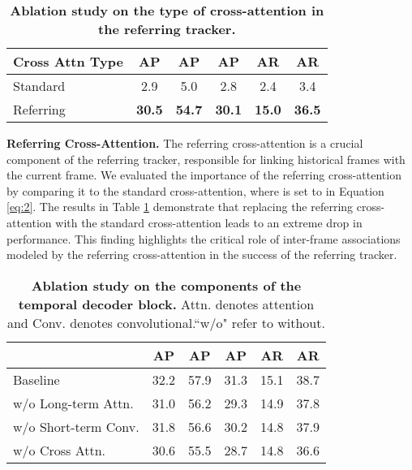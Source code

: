 \documentclass[10pt,twocolumn,letterpaper]{article}
\begin{document}
\begin{table}[t]
\centering
\begin{tabular}{l|ccccc}
	Cross Attn Type & AP &  AP & AP & AR & AR  \\
	\hline
	Standard & 2.9 & 5.0 & 2.8 & 2.4 & 3.4 \\
	Referring & \textbf{30.5} & \textbf{54.7} & \textbf{30.1} & \textbf{15.0} & \textbf{36.5} \\
\hline
 \end{tabular}
 \caption{\textbf{Ablation study on the type of cross-attention in the referring tracker.}}\vspace{-2mm}
 \label{tab:cross attn}
\end{table}

\textbf{Referring Cross-Attention.} The referring cross-attention is a crucial component of the referring tracker, responsible for linking historical frames with the current frame. We evaluated the importance of the referring cross-attention by comparing it to the standard cross-attention, where  is set to  in Equation \ref{eq:2}. The results in Table \ref{tab:cross attn} demonstrate that replacing the referring cross-attention with the standard cross-attention leads to an extreme drop in performance. This finding highlights the critical role of inter-frame associations modeled by the referring cross-attention in the success of the referring tracker.

\begin{table}[t]
\centering
\setlength{\tabcolsep}{1.4mm}
\begin{tabular}{l|ccccc}
	 & AP &  AP & AP & AR & AR  \\
	\hline
	Baseline & 32.2 & 57.9 & 31.3 & 15.1 & 38.7 \\
	w/o Long-term Attn. & 31.0 & 56.2 & 29.3 & 14.9 & 37.8 \\
	w/o Short-term Conv. & 31.8 & 56.6 & 30.2 & 14.8 & 37.9 \\ 
	w/o Cross Attn. & 30.6 & 55.5 & 28.7 & 14.8 & 36.6 \\
\hline
 \end{tabular}
 \caption{\textbf{Ablation study on the components of the temporal decoder block.} Attn. denotes attention and Conv. denotes convolutional.``w/o" refer to without.}\vspace{-3mm}
 \label{tab:offline decoder}
\end{table}
\end{document}
